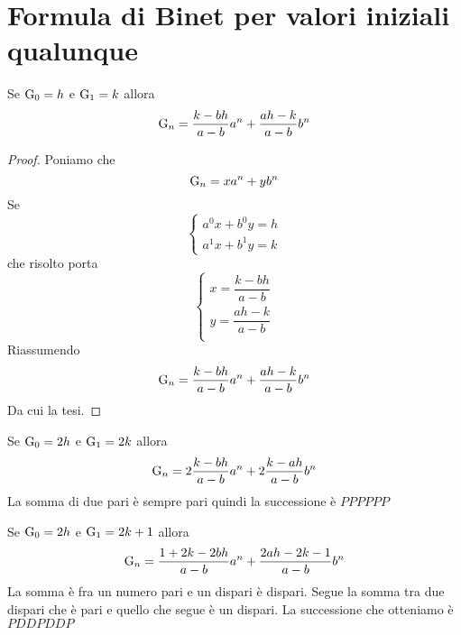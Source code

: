 \section{Formula di Binet per valori iniziali qualunque}
\begin{thm}\label{thm:FormulaBinetgeneralizzata}
Se $\mathrm{G}_{0}={}h$ e $\mathrm{G}_{1}={}k$ allora
\begin{equation}
\mathrm{G}_{n}={}\dfrac{k-bh}{a-b}a^n+\dfrac{ah-k}{a-b}b^n
\end{equation}\label{eqn:FormulaBinetgeneralizzata}
\end{thm}
\begin{proof}
Poniamo che \begin{equation}
	\mathrm{G}_{n}=xa^n+yb^n
\end{equation} Se
\begin{equation*}
	\left\{
	\begin{aligned}
		a^0x+b^0y=h\\ a^1x+b^1y=k
	\end{aligned}
	\right.
\end{equation*}
che risolto porta
\begin{equation*}
	\left\{
	\begin{aligned}
		x=\dfrac{k-bh}{a-b}\\y=\dfrac{ah-k}{a-b}\\
	\end{aligned}
	\right.
\end{equation*}
Riassumendo
 \begin{equation*}
	\mathrm{G}_{n}={}\dfrac{k-bh}{a-b}a^n+\dfrac{ah-k}{a-b}b^n
\end{equation*}
Da cui la tesi.
\end{proof}
\begin{commento}
	Se $\mathrm{G}_{0}={}2h$ e $\mathrm{G}_{1}={}2k$ allora \begin{equation}
		\mathrm{G}_{n}={}2\dfrac{k-bh}{a-b}a^n+2\dfrac{k-ah}{a-b}b^n
	\end{equation}
La somma di due pari è sempre pari quindi la successione è $PPPPPP$
\end{commento}
\begin{commento}
	Se $\mathrm{G}_{0}={}2h$ e $\mathrm{G}_{1}={}2k+1$ allora \begin{equation}
		\mathrm{G}_{n}={}\dfrac{1+2k-2bh}{a-b}a^n+\dfrac{2ah-2k-1}{a-b }b^n
	\end{equation}
La somma è fra un numero pari e un dispari è dispari. Segue la somma tra due 
dispari che è pari e quello che segue è un dispari. La successione che 
otteniamo  è $PDDPDDP$
\end{commento}
